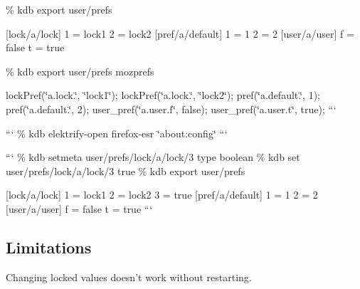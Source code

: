 \% kdb export user/prefs

\mbox{[}lock/a/lock\mbox{]} 1 = lock1 2 = lock2 \mbox{[}pref/a/default\mbox{]} 1 = 1 2 = 2 \mbox{[}user/a/user\mbox{]} f = false t = true

\% kdb export user/prefs mozprefs

lock\+Pref(\char`\"{}a.\+lock.\char`\"{}, \char`\"{}lock1\char`\"{}); lock\+Pref(\char`\"{}a.\+lock.\char`\"{}, \char`\"{}lock2\char`\"{}); pref(\char`\"{}a.\+default.\char`\"{}, 1); pref(\char`\"{}a.\+default.\char`\"{}, 2); user\+\_\+pref(\char`\"{}a.\+user.\+f\char`\"{}, false); user\+\_\+pref(\char`\"{}a.\+user.\+t\char`\"{}, true); ```

``` \% kdb elektrify-\/open firefox-\/esr \char`\"{}about\+:config\char`\"{} ```

 ``` \% kdb setmeta user/prefs/lock/a/lock/3 type boolean \% kdb set user/prefs/lock/a/lock/3 true \% kdb export user/prefs

\mbox{[}lock/a/lock\mbox{]} 1 = lock1 2 = lock2 3 = true \mbox{[}pref/a/default\mbox{]} 1 = 1 2 = 2 \mbox{[}user/a/user\mbox{]} f = false t = true ``` 

\subsection*{Limitations}

Changing locked values doesn't work without restarting. 